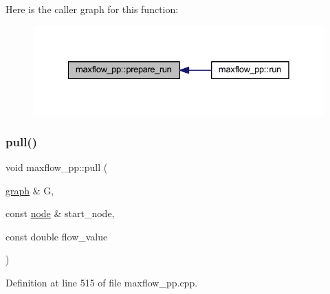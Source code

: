 Here is the caller graph for this function\+:\nopagebreak
\begin{figure}[H]
\begin{center}
\leavevmode
\includegraphics[width=328pt]{classmaxflow__pp_a7a738741f8050df0cb0be0381aef0825_icgraph}
\end{center}
\end{figure}
\mbox{\label{classmaxflow__pp_aba2aefadd6dde920b8b8aa44af95ad9b}} 
\subsubsection{\texorpdfstring{pull()}{pull()}}
{\footnotesize\ttfamily void maxflow\+\_\+pp\+::pull (\begin{DoxyParamCaption}\item[{\mbox{\hyperlink{classgraph}{graph}} \&}]{G,  }\item[{const \mbox{\hyperlink{classnode}{node}} \&}]{start\+\_\+node,  }\item[{const double}]{flow\+\_\+value }\end{DoxyParamCaption})\hspace{0.3cm}{\ttfamily [protected]}}



Definition at line 515 of file maxflow\+\_\+pp.\+cpp.


